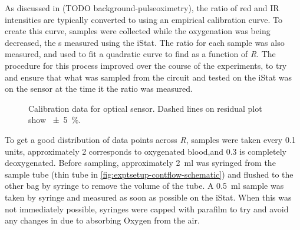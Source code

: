 As discussed in (TODO background-pulseoximetry), the ratio of red and IR intensities are typically converted to \SOtwo using an empirical calibration curve.
To create this curve, samples were collected while the oxygenation was being decreased, the \SOtwo{}s measured using the iStat.
The ratio for each sample was also measured, and used to fit a quadratic curve to find \SOtwo as a function of \textit{R}.
The procedure for this process improved over the course of the experiments, to try and ensure that what was sampled from the circuit and tested on the iStat was on the sensor at the time it the ratio was measured.
\begin{figure}[t]
\centering
{}
\caption[Calibration data for optical \SOtwo sensor]{Calibration data for optical \SOtwo sensor. Dashed lines on residual plot show \SI{\pm5}{\percent}.}
\label{fig:exptsetup-oximetercal}
\end{figure}
To get a good distribution of data points across \textit{R}, samples were taken every 0.1 units, approximately 2 corresponds to oxygenated blood,and 0.3 is completely deoxygenated.
Before sampling, approximately \SI{2}{ml} was syringed from the sample tube (thin tube in \autoref{fig:exptsetup-contflow-schematic}) and flushed to the other bag by syringe to remove the volume of the tube.
A \SI{0.5}{ml} sample was taken by syringe and measured as soon as possible on the iStat.
When this was not immediately possible, syringes were capped with parafilm to try and avoid any changes in \SOtwo due to absorbing Oxygen from the air.

